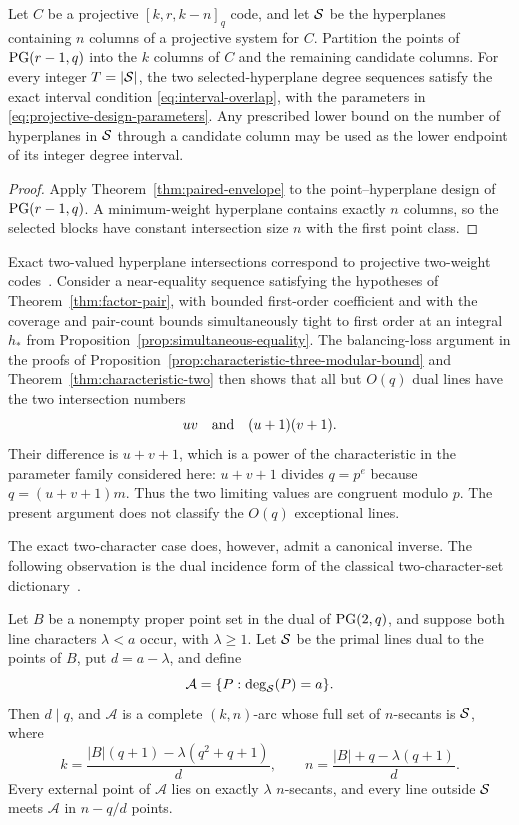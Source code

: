 \begin{corollary}\label{cor:projective-codes}
Let \(C\) be a projective \([k,r,k-n]_q\) code, and let \(\mathcal S\) be the
hyperplanes containing \(n\) columns of a projective system for \(C\).
Partition the points of \(\mathrm{PG}(r-1,q)\) into the
\(k\) columns of \(C\) and the remaining candidate columns.  For every
integer \(T=|\mathcal S|\), the two selected-hyperplane degree sequences satisfy the
exact interval condition \eqref{eq:interval-overlap}, with the parameters in
\eqref{eq:projective-design-parameters}.  Any prescribed lower bound on the
number of hyperplanes in \(\mathcal S\) through a candidate column may be used
as the lower endpoint of its integer degree interval.
\end{corollary}

\begin{proof}
Apply Theorem~\ref{thm:paired-envelope} to the point--hyperplane design of
\(\mathrm{PG}(r-1,q)\).  A minimum-weight hyperplane contains exactly \(n\) columns,
so the selected blocks have constant intersection size \(n\) with the first
point class.
\end{proof}

Exact two-valued hyperplane intersections correspond to projective two-weight
codes~\cite{CalderbankKantor}.  Consider a near-equality sequence satisfying
the hypotheses of Theorem~\ref{thm:factor-pair}, with bounded first-order
coefficient and with the coverage and pair-count bounds simultaneously tight
to first order at an integral \(h_*\) from
Proposition~\ref{prop:simultaneous-equality}.  The balancing-loss argument in
the proofs of Proposition~\ref{prop:characteristic-three-modular-bound} and
Theorem~\ref{thm:characteristic-two} then shows that all but \(O(q)\) dual lines have
the two intersection numbers
\[
 uv\quad\hbox{and}\quad (u+1)(v+1).
\]
Their difference is \(u+v+1\), which is a power of the characteristic in the
parameter family considered here: \(u+v+1\) divides \(q=p^e\) because
\(q=(u+v+1)m\).  Thus the two limiting values are congruent modulo \(p\).
The present argument does not classify the \(O(q)\) exceptional lines.

The exact two-character case does, however, admit a canonical inverse.  The
following observation is the dual incidence form of the classical
two-character-set dictionary~\cite{CalderbankKantor}.

\begin{proposition}
\label{prop:two-character-inverse}
Let \(B\) be a nonempty proper point set in the dual of \(\mathrm{PG}(2,q)\), and
suppose both line characters \(\lambda<a\) occur, with \(\lambda\ge1\).
Let \(\mathcal S\) be the primal lines dual to the points of \(B\), put
\(d=a-\lambda\), and define
\[
 \mathcal A=\{P:\deg_{\mathcal S}(P)=a\}.
\]
Then \(d\mid q\), and \(\mathcal A\) is a complete \((k,n)\)-arc whose full
set of \(n\)-secants is \(\mathcal S\), where
\[
 k=\frac{|B|(q+1)-\lambda(q^2+q+1)}d,
 \qquad
 n=\frac{|B|+q-\lambda(q+1)}d.
\]
Every external point of \(\mathcal A\) lies on exactly \(\lambda\)
\(n\)-secants, and every line outside \(\mathcal S\) meets \(\mathcal A\) in
\(n-q/d\) points.
\end{proposition}

